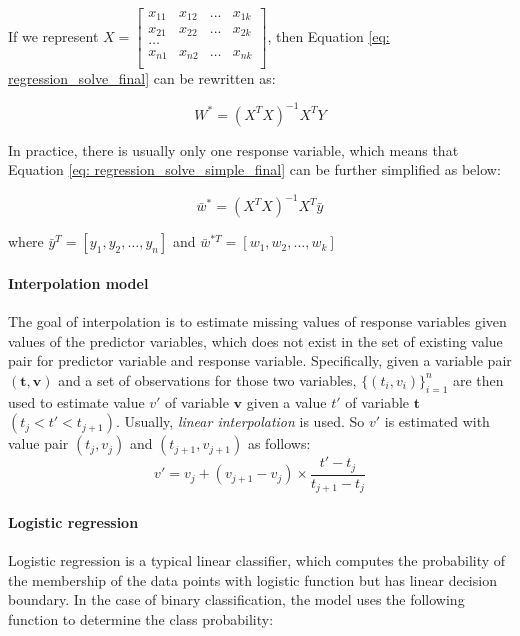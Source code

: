 If we represent $X = \begin{bmatrix}
x_{11} & x_{12} &\dots &x_{1k}\\
x_{21} & x_{22} &\dots &x_{2k}\\
\dots\\
x_{n1} & x_{n2} &\dots &x_{nk}\\
\end{bmatrix}$, then Equation \ref{eq: regression_solve_final} can be rewritten as:

\begin{equation}\label{eq: regression_solve_simple_final}
    W^*=(X^TX)^{-1}X^TY
\end{equation}

In practice, there is usually only one response variable, which means that Equation \ref{eq: regression_solve_simple_final} can be further simplified as below:

\begin{equation}\label{eq: regression_solve_simple_final_simple}
    \bar{w}^*=(X^TX)^{-1}X^T\bar{y}
\end{equation}

where $\bar{y}^T = [y_1,y_2,\dots,y_n]$ and $\bar{w}^{*T} =[w_1,w_2,\dots,w_k]$

\paragraph{Interpolation model} 

The goal of interpolation is to estimate missing values of response variables given values of the predictor variables, which does not exist in the set of existing value pair for predictor variable and response variable. Specifically, given a variable pair $(\textbf{t},\textbf{v})$ and a set of observations for those two variables, $\{(t_i, v_i)\}_{i=1}^n$ are then used to estimate value $v'$ of variable $\textbf{v}$ given a value $t'$ of variable $\textbf{t}$ $(t_j< t' < t_{j+1})$. Usually, {\em linear interpolation} is used. So $v'$ is estimated with value pair $(t_j, v_j)$ and $(t_{j+1}, v_{j+1})$ as follows:
\begin{equation}\label{eq: interpolation}
    v'= v_j + (v_{j+1}-v_j)\times\frac{t'-t_j}{t_{j+1}-t_j}
\end{equation}



\paragraph{Logistic regression}
Logistic regression is a typical linear classifier, which computes the probability of the membership of the data points with logistic function but has linear decision boundary. In the case of binary classification, the model uses the following function to determine the class probability:

